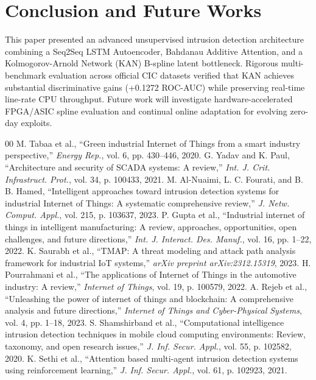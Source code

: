 \documentclass[twocolumn]{article}
\begin{document}
\section{Conclusion and Future Works}
This paper presented an advanced unsupervised intrusion detection architecture combining a Seq2Seq LSTM Autoencoder, Bahdanau Additive Attention, and a Kolmogorov-Arnold Network (KAN) B-spline latent bottleneck. Rigorous multi-benchmark evaluation across official CIC datasets verified that KAN achieves substantial discriminative gains (+0.1272 ROC-AUC) while preserving real-time line-rate CPU throughput. Future work will investigate hardware-accelerated FPGA/ASIC spline evaluation and continual online adaptation for evolving zero-day exploits.

\begin{thebibliography}{00}
 M. Tabaa et al., ``Green industrial Internet of Things from a smart industry perspective,'' \textit{Energy Rep.}, vol. 6, pp. 430--446, 2020.
 G. Yadav and K. Paul, ``Architecture and security of SCADA systems: A review,'' \textit{Int. J. Crit. Infrastruct. Prot.}, vol. 34, p. 100433, 2021.
 M. Al-Nuaimi, L. C. Fourati, and B. B. Hamed, ``Intelligent approaches toward intrusion detection systems for industrial Internet of Things: A systematic comprehensive review,'' \textit{J. Netw. Comput. Appl.}, vol. 215, p. 103637, 2023.
 P. Gupta et al., ``Industrial internet of things in intelligent manufacturing: A review, approaches, opportunities, open challenges, and future directions,'' \textit{Int. J. Interact. Des. Manuf.}, vol. 16, pp. 1--22, 2022.
 K. Saurabh et al., ``TMAP: A threat modeling and attack path analysis framework for industrial IoT systems,'' \textit{arXiv preprint arXiv:2312.15319}, 2023.
 H. Pourrahmani et al., ``The applications of Internet of Things in the automotive industry: A review,'' \textit{Internet of Things}, vol. 19, p. 100579, 2022.
 A. Rejeb et al., ``Unleashing the power of internet of things and blockchain: A comprehensive analysis and future directions,'' \textit{Internet of Things and Cyber-Physical Systems}, vol. 4, pp. 1--18, 2023.
 S. Shamshirband et al., ``Computational intelligence intrusion detection techniques in mobile cloud computing environments: Review, taxonomy, and open research issues,'' \textit{J. Inf. Secur. Appl.}, vol. 55, p. 102582, 2020.
 K. Sethi et al., ``Attention based multi-agent intrusion detection systems using reinforcement learning,'' \textit{J. Inf. Secur. Appl.}, vol. 61, p. 102923, 2021.

\end{thebibliography}
\end{document}
